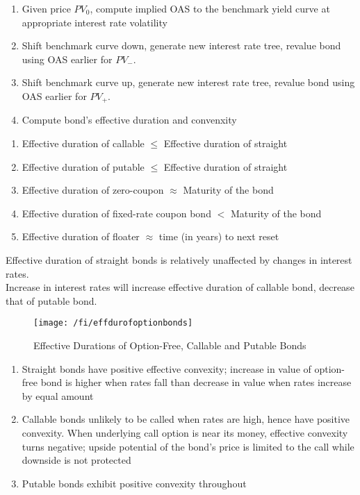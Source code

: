\begin{remark} 
\begin{enumerate}[label=\roman*.]
\setlength{\itemsep}{0pt}
\item Given price $PV_0$, compute implied OAS to the benchmark yield curve at appropriate interest rate volatility
\item Shift benchmark curve down, generate new interest rate tree, revalue bond using OAS earlier for $PV_{-}$.
\item Shift benchmark curve up, generate new interest rate tree, revalue bond using OAS earlier for $PV_{+}$.
\item Compute bond's effective duration and convenxity
\end{enumerate}
\end{remark}

\begin{remark} 
\begin{enumerate}[label=\roman*.]
\setlength{\itemsep}{0pt}
\item Effective duration of callable $\leq$ Effective duration of straight
\item Effective duration of putable $\leq$ Effective duration of straight
\item Effective duration of zero-coupon $\approx$ Maturity of the bond
\item Effective duration of fixed-rate coupon bond $<$ Maturity of the bond
\item Effective duration of floater $\approx$ time (in years) to next reset
\end{enumerate}
Effective duration of straight bonds is relatively unaffected by changes in interest rates.\\
Increase in interest rates will increase effective duration of callable bond, decrease that of putable bond.
\end{remark}

\begin{figure}[H]
\centering
\texttt{[image: /fi/effdurofoptionbonds]}
\caption{Effective Durations of Option-Free, Callable and Putable Bonds}
\end{figure}

\begin{remark} 
\begin{enumerate}[label=\roman*.]
\setlength{\itemsep}{0pt}
\item Straight bonds have positive effective convexity; increase in value of option-free bond is higher when rates fall than decrease in value when rates increase by equal amount
\item Callable bonds unlikely to be called when rates are high, hence have positive convexity. When underlying call option is near its money, effective convexity turns negative; upside potential of the bond's price is limited to the call while downside is not protected
\item Putable bonds exhibit positive convexity throughout
\end{enumerate}
\end{remark}

